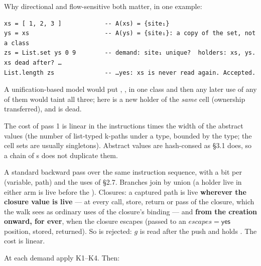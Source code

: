 Why directional and flow-sensitive both matter, in one example:

\begin{Verbatim}
xs = [ 1, 2, 3 ]            -- A(xs) = {site₁}
ys = xs                     -- A(ys) = {site₁}: a copy of the set, not a class
zs = List.set ys 0 9        -- demand: site₁ unique?  holders: xs, ys. xs dead after? …
List.length zs              -- …yes: xs is never read again. Accepted.
\end{Verbatim}

A unification-based model would put , ,  in one class and then any later use of any of them would taint all three; here  is a new holder of the \emph{same} cell (ownership transferred), and  is dead.

The cost of pass 1 is linear in the instructions times the width of the abstract values (the number of list-typed k-paths under a type, bounded by the type; the cell sets are usually singletons). Abstract values are hash-consed as  §3.1 does, so a chain of s does not duplicate them.


A standard backward pass over the same instruction sequence, with a bit per (variable, path) and the uses of §2.7. Branches join by union (a holder live in either arm is live before the ). Closures: a captured path is live \textbf{wherever the closure value is live} — at every call, store, return or pass of the closure, which the walk sees as ordinary uses of the closure's binding — and \textbf{from the creation onward, for ever}, when the closure escapes (passed to an $\mathit{escapes}=\mathsf{yes}$ position, stored, returned). So  is rejected: $g$ is read after the push and holds . The cost is linear.


At each demand apply K1–K4. Then:

